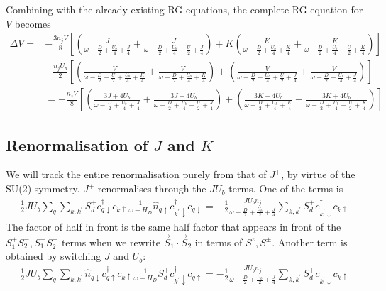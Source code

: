 \documentclass[10pt]{report}
\numberwithin{equation}{section}
\begin{document}
\begin{appendices}
Combining with the already existing RG equations, the complete RG equation for \(V\) becomes
\begin{equation}\begin{aligned}
	\Delta V =& -\frac{3n_j V}{8}\left[\left(\frac{J}{\omega - \frac{D}{2} + \frac{U_b}{4} + \frac{J}{4}} + \frac{J}{\omega - \frac{D}{2} + \frac{U_b}{4} + \frac{U}{2} + \frac{J}{4}}\right) + K \left(\frac{K}{\omega - \frac{D}{2} + \frac{U_b}{4} + \frac{K}{4}} + \frac{K}{\omega - \frac{D}{2} + \frac{U_b}{4} - \frac{U}{2} + \frac{K}{4}}\right)\right]\\
		 &-\frac{n_jU_b}{2}\left[\left(\frac{V}{\omega - \frac{D}{2} - \frac{U}{2} + \frac{U_b}{4} + \frac{K}{4}} + \frac{V}{\omega - \frac{D}{2} + \frac{U_b}{4} + \frac{K}{4}}\right) + \left(\frac{V}{\omega - \frac{D}{2} + \frac{U_b}{4} + \frac{U}{2} + \frac{J}{4}} + \frac{V}{\omega - \frac{D}{2} + \frac{U_b}{4} + \frac{J}{4}}\right)\right]\\
		 &=-\frac{n_j V}{8}\left[\left(\frac{3J + 4U_b}{\omega - \frac{D}{2} + \frac{U_b}{4} + \frac{J}{4}} + \frac{3J + 4U_b}{\omega - \frac{D}{2} + \frac{U_b}{4} + \frac{U}{2} + \frac{J}{4}}\right) + \left(\frac{3K + 4U_b}{\omega - \frac{D}{2} + \frac{U_b}{4} + \frac{K}{4}} + \frac{3K + 4U_b}{\omega - \frac{D}{2} + \frac{U_b}{4} - \frac{U}{2} + \frac{K}{4}}\right)\right]
\end{aligned}\end{equation}

\subsection{Renormalisation of \(J\) and \(K\)}
We will track the entire renormalisation purely from that of \(J^+\), by virtue of the SU(2) symmetry. \(J^+\) renormalises through the \(J U_b\) terms. One of the terms is
\begin{equation}\begin{aligned}
	\frac{1}{2} J U_b \sum_{q} \sum_{k,k^\prime} S_d^+ c^\dagger_{q \downarrow} c_{k \uparrow} \frac{1}{\omega - H_D} \hat n_{q \uparrow} c^\dagger_{k^\prime \downarrow}c_{q \downarrow} = -\frac{1}{2}\frac{J U_b n_j}{\omega - \frac{D}{2} + \frac{U_b}{2} + \frac{J}{4}} \sum_{k,k^\prime} S_d^+ c^\dagger_{k^\prime \downarrow} c_{k \uparrow}
\end{aligned}\end{equation}
The factor of half in front is the same half factor that appears in front of the \(S_1^+ S_2^-, S_1^-S_2^+\) terms when we rewrite \(\vec{S}_1\cdot\vec{S}_2\) in terms of \(S^z, S^\pm\). Another term is obtained by switching \(J\) and \(U_b\):
\begin{equation}\begin{aligned}
	\frac{1}{2} J U_b \sum_{q} \sum_{k,k^\prime} \hat n_{q \downarrow} c^\dagger_{q \uparrow} c_{k \uparrow} \frac{1}{\omega - H_D}S_d^+ c^\dagger_{k^\prime \downarrow} c_{q \uparrow} = -\frac{1}{2}\frac{J U_b n_j}{\omega - \frac{D}{2} + \frac{U_b}{2} + \frac{J}{4}} \sum_{k,k^\prime} S_d^+ c^\dagger_{k^\prime \downarrow} c_{k \uparrow}
\end{aligned}\end{equation}


\end{appendices}
\end{document}
